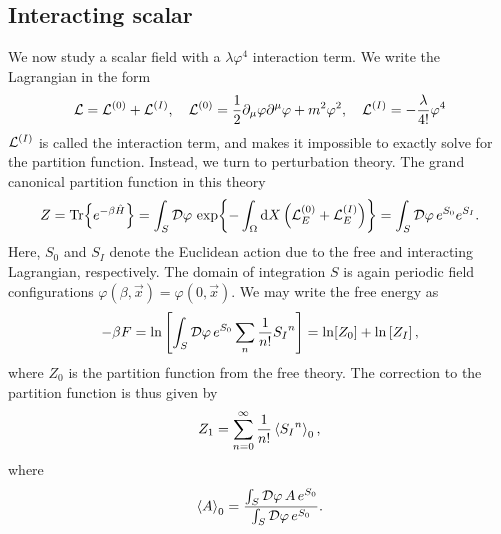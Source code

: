 \subsection*{Interacting scalar}

We now study a scalar field with a $\lambda \varphi^4$ interaction term.
We write the Lagrangian in the form
\begin{equation*}
    \mathcal{L} = \mathcal{L}^{(0)} + \mathcal{L}^{(I)}, \quad 
    \mathcal{L}^{(0)} = 
    \frac{1}{2} \partial_\mu \varphi \partial^\mu \varphi  + m^2 \varphi^2 , \quad
    \mathcal{L}^{(I)} = - \frac{\lambda}{4!} \varphi^4
\end{equation*}
$\mathcal{L}^{(I)}$ is called the interaction term, and makes it impossible to exactly solve for the partition function.
Instead, we turn to perturbation theory.
The grand canonical partition function in this theory
\begin{equation}
    Z = \Tr{e^{- \beta \hat H}}
    = \int_S \mathcal{D} \varphi \, \exp{
        - \int_\Omega \dd X \left(\mathcal{L}_E^{(0)} + \mathcal{L}_E^{(I)}\right)
    }
    = \int_S \mathcal{D} \varphi \, e^{S_0} e^{S_I}.
\end{equation}
Here, $S_0$ and $S_I$ denote the Euclidean action due to the free and interacting Lagrangian, respectively.
The domain of integration $S$ is again periodic field configurations $\varphi(\beta, \vec x) = \varphi(0, \vec x)$.
We may write the free energy as
\begin{equation*}
    - \beta F = \ln
    \left[
        \int_S \mathcal{D} \varphi \, e^{S_0} \sum_n \frac{1}{n!} {S_I}^n
    \right]
    = \ln[Z_0] 
    + \ln
    \left[
        Z_I
    \right],
\end{equation*}
where $Z_0$ is the partition function from the free theory.
The correction to the partition function is thus given by
\begin{equation}
    Z_1 = \sum_{n=0}^\infty \frac{1}{n!} \ex{{S_I}^n}_0,
\end{equation}
where
\begin{equation}
    \ex{A}_0 = \frac{
        \int_S \D \varphi \, A \, e^{S_0} }
    {\int_S \D \varphi \, e^{S_0}}.
\end{equation}
